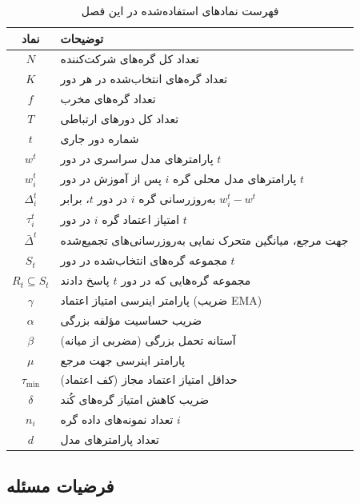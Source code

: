 \begin{table}[t]
    \centering
    \renewcommand{\arraystretch}{1.8}
    \caption{فهرست نمادهای استفاده‌شده در این فصل}
    \label{tab:symbols}
    \begin{tabular}{cp{11cm}}
        \toprule
        \textbf{نماد} & \textbf{توضیحات} \\
        \midrule
        $N$ & تعداد کل گره‌های شرکت‌کننده \\
        $K$ & تعداد گره‌های انتخاب‌شده در هر دور \\
        $f$ & تعداد گره‌های مخرب \\
        $T$ & تعداد کل دورهای ارتباطی \\
        $t$ & شماره دور جاری \\
        $w^t$ & پارامترهای مدل سراسری در دور $t$ \\
        $w_i^t$ & پارامترهای مدل محلی گره $i$ پس از آموزش در دور $t$ \\
        $\Delta_i^t$ & به‌روزرسانی گره $i$ در دور $t$، برابر $w_i^t - w^t$ \\
        $\tau_i^t$ & امتیاز اعتماد گره $i$ در دور $t$ \\
        $\bar{\Delta}^t$ & جهت مرجع، میانگین متحرک نمایی به‌روزرسانی‌های تجمیع‌شده \\
        $S_t$ & مجموعه گره‌های انتخاب‌شده در دور $t$ \\
        $R_t \subseteq S_t$ & مجموعه گره‌هایی که در دور $t$ پاسخ دادند \\
        $\gamma$ & پارامتر اینرسی امتیاز اعتماد (ضریب \gls{EMA}) \\
        $\alpha$ & ضریب حساسیت مؤلفه بزرگی \\
        $\beta$ & آستانه تحمل بزرگی (مضربی از میانه) \\
        $\mu$ & پارامتر اینرسی جهت مرجع \\
        $\tau_{\min}$ & حداقل امتیاز اعتماد مجاز (کف اعتماد) \\
        $\delta$ & ضریب کاهش امتیاز گره‌های کُند \\
        $n_i$ & تعداد نمونه‌های داده گره $i$ \\
        $d$ & تعداد پارامترهای مدل \\
        \bottomrule
    \end{tabular}
\end{table}

\subsection{فرضیات مسئله}

